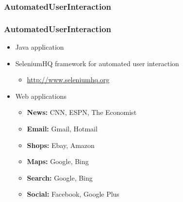 \documentclass[xcolor=x11names,compress]{beamer}
\begin{document}
	\subsubsection{AutomatedUserInteraction}
	\begin{frame}
		\frametitle{AutomatedUserInteraction}
		\begin{itemize}
			\item Java application
			\item SeleniumHQ framework for automated user interaction
			\begin{itemize}
				\item \href{http://www.seleniumhq.org/}{http://www.seleniumhq.org}
			\end{itemize}
			\item Web applications
			\begin{itemize}
				\item \textbf{News:} CNN, ESPN, The Economist
				\item \textbf{Email:} Gmail, Hotmail
				\item \textbf{Shops:} Ebay, Amazon
				\item \textbf{Maps:} Google, Bing
				\item \textbf{Search:} Google, Bing
				\item \textbf{Social:} Facebook, Google Plus
			\end{itemize}
		\end{itemize}
	\end{frame}
	
\end{document}
